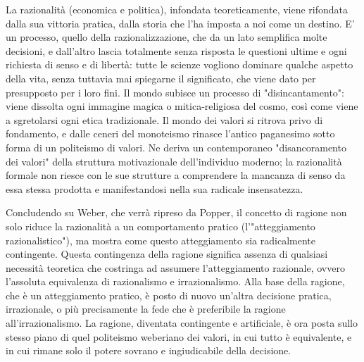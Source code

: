 La razionalità (economica e politica), infondata teoreticamente, viene rifondata dalla sua vittoria pratica, dalla storia che l'ha imposta a noi come un destino. E' un processo, quello della razionalizzazione, che da un lato semplifica molte decisioni, e dall'altro lascia totalmente senza risposta le questioni ultime e ogni richiesta di senso e di libertà: tutte le scienze vogliono dominare qualche aspetto della vita, senza tuttavia mai spiegarne il significato, che viene dato per presupposto per i loro fini. Il mondo subisce un processo di "disincantamento": viene  dissolta ogni immagine magica o mitica-religiosa del cosmo, così come viene a sgretolarsi ogni etica tradizionale. Il mondo dei valori si ritrova privo di fondamento, e dalle ceneri del monoteismo rinasce  l'antico paganesimo sotto forma di un politeismo di valori. Ne deriva un contemporaneo "disancoramento dei valori" della struttura motivazionale dell'individuo moderno; la razionalità formale non riesce con le sue strutture a comprendere la mancanza di senso da essa stessa prodotta e manifestandosi  nella sua radicale insensatezza.

Concludendo su Weber, che verrà ripreso da Popper, il concetto di ragione non solo riduce la razionalità a un comportamento pratico (l'"atteggiamento razionalistico"), ma mostra come questo atteggiamento sia radicalmente contingente. Questa contingenza della ragione significa assenza di qualsiasi necessità teoretica che costringa  ad assumere l'atteggiamento razionale, ovvero l'assoluta equivalenza di razionalismo e irrazionalismo. Alla base della ragione, che è un atteggiamento pratico, è posto di nuovo un'altra decisione pratica, irrazionale, o più precisamente la fede che è preferibile la ragione all'irrazionalismo. La ragione, diventata contingente e artificiale, è ora posta sullo stesso piano di quel politeismo weberiano dei valori, in cui tutto è equivalente, e in cui rimane solo il potere sovrano e ingiudicabile della decisione.

